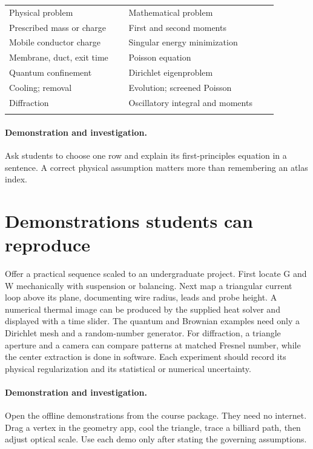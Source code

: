 \documentclass[11pt,oneside,openany]{book}
\newcommand{\toprule}{\hline\noalign{\vskip4pt}}
\newcommand{\midrule}{\noalign{\vskip3pt}\hline\noalign{\vskip4pt}}
\newcommand{\bottomrule}{\noalign{\vskip3pt}\hline}
\begin{document}
\begin{center}\small\begin{tabular}{p{0.4\linewidth}p{0.5\linewidth}}\toprule
Physical problem & Mathematical problem\\\midrule
Prescribed mass or charge & First and second moments\\
Mobile conductor charge & Singular energy minimization\\
Membrane, duct, exit time & Poisson equation\\
Quantum confinement & Dirichlet eigenproblem\\
Cooling; removal & Evolution; screened Poisson\\
Diffraction & Oscillatory integral and moments\\\bottomrule\end{tabular}\end{center}

\paragraph{Demonstration and investigation.} Ask students to choose one row and explain its first-principles equation in a sentence. A correct physical assumption matters more than remembering an atlas index.


\section{Demonstrations students can reproduce}\label{sec:slide88}

Offer a practical sequence scaled to an undergraduate project. First locate G and W mechanically with suspension or balancing. Next map a triangular current loop above its plane, documenting wire radius, leads and probe height. A numerical thermal image can be produced by the supplied heat solver and displayed with a time slider. The quantum and Brownian examples need only a Dirichlet mesh and a random-number generator. For diffraction, a triangle aperture and a camera can compare patterns at matched Fresnel number, while the center extraction is done in software. Each experiment should record its physical regularization and its statistical or numerical uncertainty.



\paragraph{Demonstration and investigation.} Open the offline demonstrations from the course package. They need no internet. Drag a vertex in the geometry app, cool the triangle, trace a billiard path, then adjust optical scale. Use each demo only after stating the governing assumptions.
\end{document}
